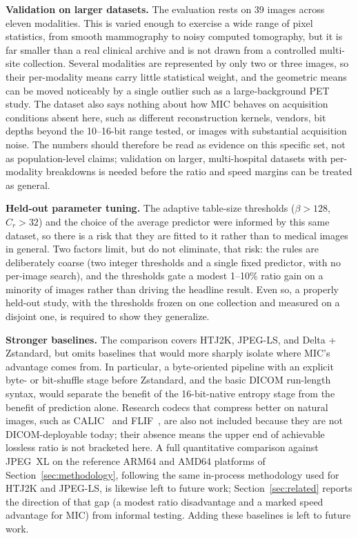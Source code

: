 \documentclass[journal]{IEEEtran}
\begin{document}
\textbf{Validation on larger datasets.} The evaluation rests on 39 images across eleven
modalities. This is varied enough to exercise a wide range of pixel statistics,
from smooth mammography to noisy computed tomography, but it is far smaller than
a real clinical archive and is not drawn from a controlled multi-site
collection. Several modalities are represented by only two or three images, so
their per-modality means carry little statistical weight, and the geometric
means can be moved noticeably by a single outlier such as a large-background PET
study. The dataset also says nothing about how MIC behaves on acquisition
conditions absent here, such as different reconstruction kernels, vendors,
bit depths beyond the 10--16-bit range tested, or images with substantial
acquisition noise. The numbers should therefore be read as evidence on this
specific set, not as population-level claims; validation on larger,
multi-hospital datasets with per-modality breakdowns is needed before the ratio
and speed margins can be treated as general.

\textbf{Held-out parameter tuning.} The adaptive table-size thresholds ($\beta >
128$, $C_r > 32$) and the choice of the average predictor were informed by this
same dataset, so there is a risk that they are fitted to it rather than to
medical images in general. Two factors limit, but do not eliminate, that risk:
the rules are deliberately coarse (two integer thresholds and a single fixed
predictor, with no per-image search), and the thresholds gate a modest 1--10\%
ratio gain on a minority of images rather than driving the headline result.
Even so, a properly held-out study, with the thresholds frozen on one collection
and measured on a disjoint one, is required to show they generalize.

\textbf{Stronger baselines.} The comparison covers HTJ2K, JPEG-LS, and Delta +
Zstandard, but omits baselines that would more sharply isolate where MIC's
advantage comes from. In particular, a byte-oriented pipeline with an explicit
byte- or bit-shuffle stage before Zstandard, and the basic DICOM run-length
syntax, would separate the benefit of the 16-bit-native entropy stage from the
benefit of prediction alone. Research codecs that compress better on natural
images, such as CALIC~\cite{wu1997} and FLIF~\cite{sneyers2016}, are also not
included because they are not DICOM-deployable today; their absence means the
upper end of achievable lossless ratio is not bracketed here. A full
quantitative comparison against JPEG~XL on the reference ARM64 and AMD64
platforms of Section~\ref{sec:methodology}, following the same in-process
methodology used for HTJ2K and JPEG-LS, is likewise left to future work;
Section~\ref{sec:related} reports the direction of that gap (a modest ratio
disadvantage and a marked speed advantage for MIC) from informal testing.
Adding these baselines is left to future work.
\end{document}
